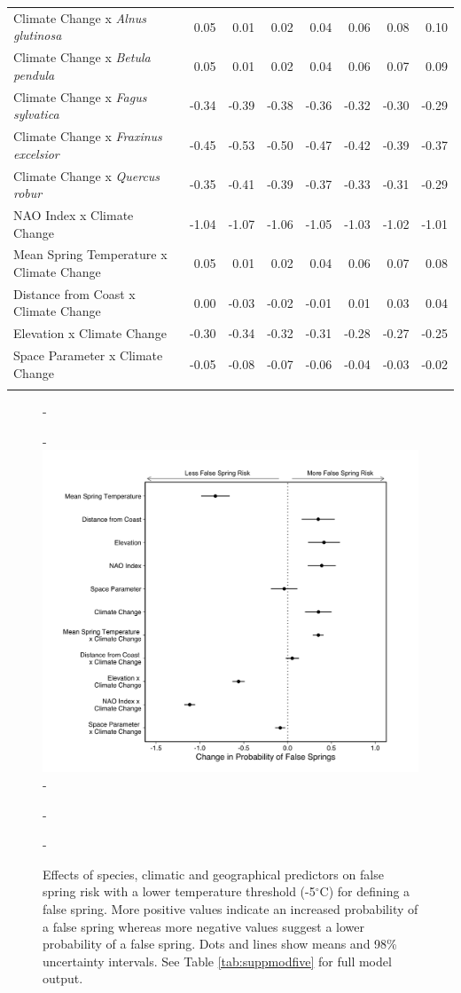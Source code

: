 \documentclass{article}\usepackage[]{graphicx}\usepackage[]{color}
\begin{document}
\begin{longtable}{lrrrrrrr}
  Climate Change
x\textit{ Alnus glutinosa} & 0.05 & 0.01 & 0.02 & 0.04 & 0.06 & 0.08 & 0.10 \\ 
  Climate Change
x\textit{ Betula pendula} & 0.05 & 0.01 & 0.02 & 0.04 & 0.06 & 0.07 & 0.09 \\ 
  Climate Change
x\textit{ Fagus sylvatica} & -0.34 & -0.39 & -0.38 & -0.36 & -0.32 & -0.30 & -0.29 \\ 
  Climate Change
x\textit{ Fraxinus excelsior} & -0.45 & -0.53 & -0.50 & -0.47 & -0.42 & -0.39 & -0.37 \\ 
  Climate Change
x\textit{ Quercus robur} & -0.35 & -0.41 & -0.39 & -0.37 & -0.33 & -0.31 & -0.29 \\ 
  NAO Index x Climate Change & -1.04 & -1.07 & -1.06 & -1.05 & -1.03 & -1.02 & -1.01 \\ 
  Mean Spring 
Temperature x Climate Change & 0.05 & 0.01 & 0.02 & 0.04 & 0.06 & 0.07 & 0.08 \\ 
  Distance from 
Coast x Climate Change & 0.00 & -0.03 & -0.02 & -0.01 & 0.01 & 0.03 & 0.04 \\ 
  Elevation x Climate Change & -0.30 & -0.34 & -0.32 & -0.31 & -0.28 & -0.27 & -0.25 \\ 
  Space Parameter x Climate Change & -0.05 & -0.08 & -0.07 & -0.06 & -0.04 & -0.03 & -0.02 \\ 
   \hline
\hline
\label{tab:suppmoddvr}
\end{longtable}


  
  {\begin{figure} [H]
  -\begin{center}
  -\includegraphics[width=12cm]{..//..//analyses/figures/model_output_98_fivelong.png}
  -\caption{Effects of species, climatic and geographical predictors on false spring risk with a lower temperature threshold (-5$^{\circ}$C) for defining a false spring. More positive values indicate an increased probability of a false spring whereas more negative values suggest a lower probability of a false spring. Dots and lines show means and 98\% uncertainty intervals. See Table \ref{tab:suppmodfive} for full model output. }\label{fig:five}
  -\end{center}
  -\end{figure}}
  
\end{document}
